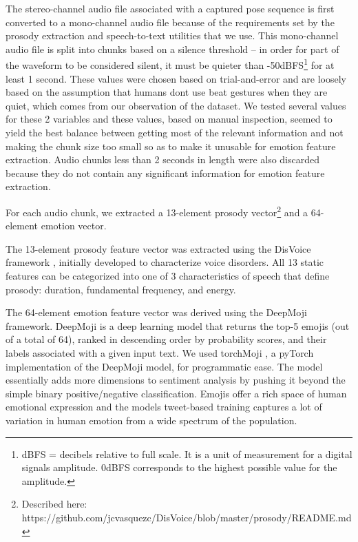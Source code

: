 The stereo-channel audio file associated with a captured pose sequence is first converted to a mono-channel audio file because of the requirements set by the prosody extraction and speech-to-text utilities that we use. This mono-channel audio file is split into chunks based on a silence threshold -- in order for part of the waveform to be considered silent, it must be quieter than -50dBFS\footnote{dBFS = decibels relative to full scale. It is a unit of measurement for a digital signal\textquotesingle s amplitude. 0dBFS corresponds to the highest possible value for the amplitude.} for at least 1 second. These values were chosen based on trial-and-error and are loosely based on the assumption that humans don\textquotesingle t use beat gestures when they are quiet, which comes from our observation of the dataset. We tested several values for these 2 variables and these values, based on manual inspection, seemed to yield the best balance between getting most of the relevant information and not making the chunk size too small so as to make it unusable for emotion feature extraction. Audio chunks less than 2 seconds in length were also discarded because they do not contain any significant information for emotion feature extraction.

For each audio chunk, we extracted a 13-element prosody vector\footnote{Described here: https://github.com/jcvasquezc/DisVoice/blob/master/prosody/README.md} and a 64-element emotion vector.

The 13-element prosody feature vector was extracted using the DisVoice framework \cite{disvoice}, initially developed to characterize voice disorders. All 13 static features can be categorized into one of 3 characteristics of speech that define prosody: duration, fundamental frequency, and energy.

The 64-element emotion feature vector was derived using the DeepMoji framework. DeepMoji is a deep learning model that returns the top-5 emojis (out of a total of 64), ranked in descending order by probability scores, and their labels associated with a given input text. We used torchMoji \cite{torchmoji}, a pyTorch implementation of the DeepMoji model, for programmatic ease. The model essentially adds more dimensions to sentiment analysis by pushing it beyond the simple binary positive/negative classification. Emojis offer a rich space of human emotional expression and the model\textquotesingle s tweet-based training captures a lot of variation in human emotion from a wide spectrum of the population.

